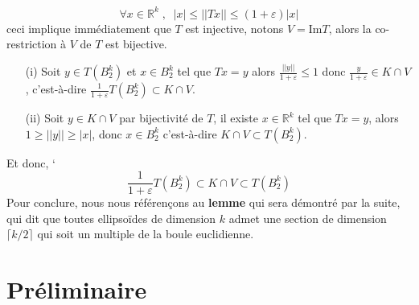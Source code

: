 \documentclass[12pt]{article}
\theoremstyle{definition}
\begin{document}
\begin{equation*}
\forall x \in \mathbb{R}^k \; , \;\; |x|\leq ||Tx||\leq (1+\varepsilon)|x|
\end{equation*}
ceci implique immédiatement que $T$ est injective, notons $V=\text{Im}T$, alors la co-restriction à $V$ de $T$ est bijective.
\begin{enumerate}
	\item[(i)]Soit $y\in T\left(B_2^k\right)$ et $x\in B_2^k$ tel que $Tx=y$ alors $\frac{||y||}{1+\varepsilon}\leq 1$ donc $\frac{y}{1+\varepsilon}\in K\cap V$, c'est-à-dire $\frac{1}{1+\varepsilon}T\left(B_2^k\right)\subset K\cap V$.
	\item[(ii)] Soit $y\in K\cap V$ par bijectivité de $T$, il existe $x\in \mathbb{R}^k$ tel que $Tx=y$, alors $1\geq ||y|| \geq |x|$, donc $x\in B_2^k$ c'est-à-dire $K\cap V\subset T\left(B_2^k\right)$.
\end{enumerate} 
Et donc, `
\begin{equation*}
	\frac{1}{1+\varepsilon}T(B_2^k)\subset K\cap V \subset T(B_2^k)
\end{equation*}
Pour conclure, nous nous référençons au \textbf{lemme } qui sera démontré par la suite, qui dit que toutes ellipsoïdes de dimension $k$ admet une section de dimension $\lceil k/2\rceil$ qui soit un multiple de la boule euclidienne. 

\newtheorem{lemme}[lemme]{Lemme}

\newtheorem{rem}[rem]{Remarque}

\newtheorem{proposition}[proposition]{Proposition}

\newtheorem{cor}[cor]{Corollaire}


\section{Préliminaire}
\end{document}
